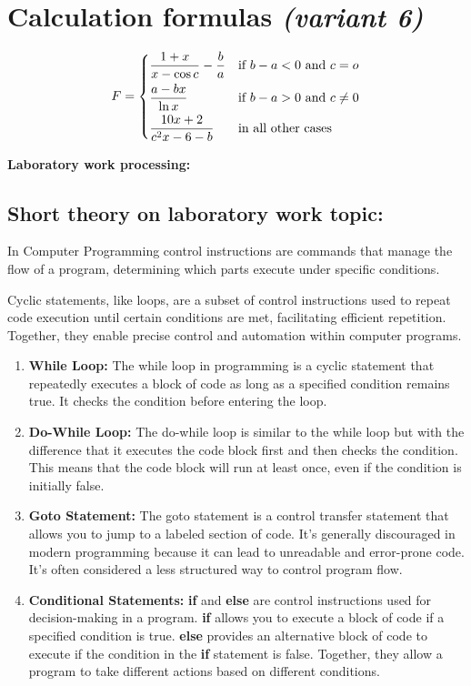 \documentclass[a4paper, 11p]{article}
\begin{document}
\section{Calculation formulas \textit{(variant 6)}}
\begin{align*}
F = 
\begin{dcases}
    \frac{1 + x}{x - \cos c} - \frac{b}{a} & \text{if } b - a < 0 \text{ and } c = o \\
    \frac{a - bx}{\ln x} & \text{if } b - a > 0 \text{ and } c \neq 0 \\
    \frac{10x + 2}{c^2x - 6 -b} & \text{in all other cases}
\end{dcases}
\end{align*}

\vspace*{.2in}
\begin{center}
    \Large \textbf{Laboratory work processing:}
\end{center}

\setcounter{section}{4}

\subsection{ Short theory on laboratory work topic:} 
In Computer Programming \cite{progsgh} control instructions are commands that manage the flow of a program, determining which parts execute under specific conditions.

Cyclic statements, like loops, are a subset of control instructions used to repeat code execution until certain conditions are met, facilitating efficient repetition. Together, they enable precise control and automation within computer programs.
\begin{enumerate}
    \item \textbf{While Loop:} The while loop in programming is a cyclic statement that repeatedly executes a block of code as long as a specified condition remains true. It checks the condition before entering the loop.
    \item \textbf{Do-While Loop:} The do-while loop is similar to the while loop but with the difference that it executes the code block first and then checks the condition. This means that the code block will run at least once, even if the condition is initially false.
    \item \textbf{Goto Statement:} The goto statement is a control transfer statement that allows you to jump to a labeled section of code. It's generally discouraged in modern programming because it can lead to unreadable and error-prone code. It's often considered a less structured way to control program flow.
    \item \textbf{Conditional Statements:} \textbf{if} and \textbf{else} are control instructions used for decision-making in a program. 
        \textbf{if} allows you to execute a block of code if a specified condition is true.
        \textbf{else} provides an alternative block of code to execute if the condition in the \textbf{if} statement is false.
        Together, they allow a program to take different actions based on different conditions.
\end{enumerate}
\pagebreak
\end{document}
